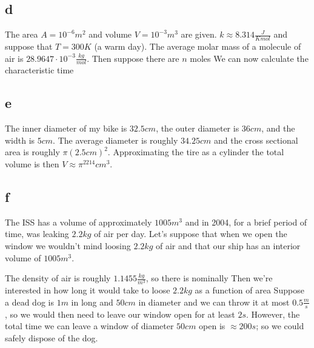 \subsection*{d}
The area $A = 10^{-6}m^2$ and volume $V=10^{-3}m^3$ are given. $k \approx 8.314\frac{J}{Kmol}$ and suppose that $T = 300K$ (a warm day). The average molar mass of a molecule of air is $28.9647\cdot10^{-3}\frac{kg}{mol}$. Then suppose there are $n$ moles
We can now calculate the characteristic time
\subsection*{e}
The inner diameter of my bike is $32.5cm$, the outer diameter is $36cm$, and the width is $5cm$. The average diameter is roughly $34.25cm$ and the cross sectional area is roughly $\pi(2.5cm)^2$. Approximating the tire as a cylinder the total volume is then $V \approx \pi^2214cm^3$.

\subsection*{f}
The ISS has a volume of approximately $1005m^3$ and in 2004, for a brief period of time, was leaking $2.2kg$ of air per day. Let's suppose that when we open the window we wouldn't mind loosing $2.2kg$ of air and that our ship has an interior volume of $1005m^3$.

The density of air is roughly $1.1455\frac{kg}{m^3}$, so there is nominally
Then we're interested in how long it would take to loose $2.2kg$ as a function of area
Suppose a dead dog is $1m$ in long and $50cm$ in diameter and we can throw it at most $0.5\frac{m}{s}$, so we would then need to leave our window open for at least $2s$. However, the total time we can leave a window of diameter $50cm$ open is $\approx200s$; so we could safely dispose of the dog.

